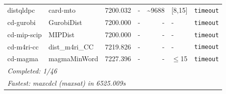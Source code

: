 \begin{longtable}{llrrrl p{}}
distqldpc & card-mto & 7200.032 & - & \textasciitilde{}9688 & [8,15] & \texttt{timeout} \\
cd-gurobi & GurobiDist & 7200.000 & - & - & - & \texttt{timeout} \\
cd-mip-scip & MIPDist & 7200.000 & - & - & - & \texttt{timeout} \\
cd-m4ri-cc & dist\_m4ri\_CC & 7219.826 & - & - & - & \texttt{timeout} \\
cd-magma & magmaMinWord & 7227.396 & - & - & $\leq$15 & \texttt{timeout} \\
\midrule
\multicolumn{7}{l}{\textit{Completed: 1/46}} \\
\multicolumn{7}{l}{\textit{Fastest: maxcdcl (maxsat) in 6525.009s}} \\
\end{longtable}
